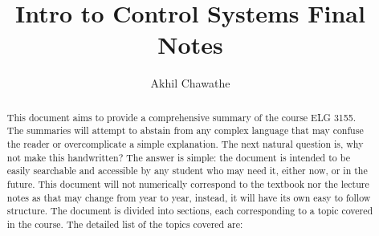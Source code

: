 \documentclass{article}
\title{Intro to Control Systems Final Notes}
\author{Akhil Chawathe}
\theoremstyle{mytheoremstyle}
\theoremstyle{mytheoremstyle}
\theoremstyle{myproblemstyle}
\theoremstyle{break}
\begin{document}
\maketitle

\begin{abstract}
	This document aims to provide a comprehensive summary of the course ELG 3155.
	The summaries will attempt to abstain from any complex language that may
	confuse the reader or overcomplicate a simple explanation.
	The next natural question is, why not make this handwritten?
	The answer is simple: the document is intended to be easily searchable and
	accessible by any student who may need it, either now, or in the future.
	This document will not numerically correspond to the textbook nor the lecture
	notes as that may change from year to year, instead,
	it will have its own easy to follow structure.
	The document is divided into sections, each corresponding to a
	topic covered in the course.
	The detailed list of the topics covered are:


\end{abstract}
\end{document}
